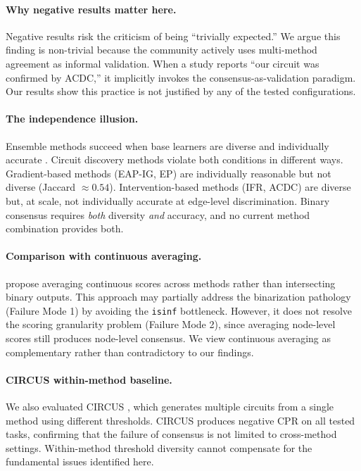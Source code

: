 \documentclass[11pt,a4paper]{article}
\begin{document}
\paragraph{Why negative results matter here.}
Negative results risk the criticism of being ``trivially expected.'' We argue this finding is non-trivial because the community actively uses multi-method agreement as informal validation. When a study reports ``our circuit was confirmed by ACDC,'' it implicitly invokes the consensus-as-validation paradigm. Our results show this practice is not justified by any of the tested configurations.

\paragraph{The independence illusion.}
Ensemble methods succeed when base learners are diverse and individually accurate \citep{kuncheva2003measures}. Circuit discovery methods violate both conditions in different ways. Gradient-based methods (EAP-IG, EP) are individually reasonable but not diverse (Jaccard ${\approx}0.54$). Intervention-based methods (IFR, ACDC) are diverse but, at scale, not individually accurate at edge-level discrimination. Binary consensus requires \emph{both} diversity \emph{and} accuracy, and no current method combination provides both.

\paragraph{Comparison with continuous averaging.}
\citet{mondorf2025beyond} propose averaging continuous scores across methods rather than intersecting binary outputs. This approach may partially address the binarization pathology (Failure Mode 1) by avoiding the \texttt{isinf} bottleneck. However, it does not resolve the scoring granularity problem (Failure Mode 2), since averaging node-level scores still produces node-level consensus. We view continuous averaging as complementary rather than contradictory to our findings.

\paragraph{CIRCUS within-method baseline.}
We also evaluated CIRCUS \citep{parekh2026circus}, which generates multiple circuits from a single method using different thresholds. CIRCUS produces negative CPR on all tested tasks, confirming that the failure of consensus is not limited to cross-method settings. Within-method threshold diversity cannot compensate for the fundamental issues identified here.
\end{document}
